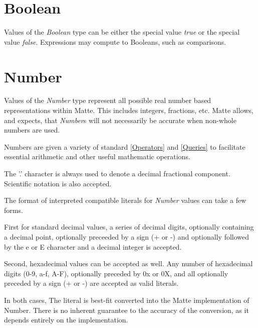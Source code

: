 \documentclass[12pt,letterpaper]{report}
\begin{document}



\section{Boolean}\label{Boolean}

Values of the \textit{Boolean} type can be either the special value \textit{true} or 
the special value \textit{false}. Expressions may compute to Booleans, such 
as comparisons.





\section{Number}\label{Number}



Values of the \textit{Number} type represent all possible real number based representations within 
Matte. This includes integers, fractions, etc. Matte allows, and expects, that \textit{Number}s will not 
necessarily be accurate when non-whole numbers are used. 

Numbers are given a variety of standard \autoref{Operators} and \autoref{Queries} to facilitate 
essential arithmetic and other useful mathematic operations.

The '.' character is always used to denote a decimal fractional component. Scientific notation
is also accepted. 

The format of interpreted compatible literals for \textit{Number} values can take a few forms. 

First for standard decimal values, a series of decimal digits, optionally containing a decimal point, 
optionally preceeded by a sign (+ or -) and optionally followed by the e or E character and a 
decimal integer is accepted.

Second, hexadecimal values can be accepted as well. Any number of hexadecimal digits (0-9, a-f, A-F), 
optionally preceded by 0x or 0X, and all optionally preceded by a sign (+ or -) are accepted 
as valid literals.

In both cases, The literal is best-fit converted into the Matte implementation of Number. 
There is no inherent guarantee to the accuracy of the conversion, as it depends 
entirely on the implementation.



\end{document}
